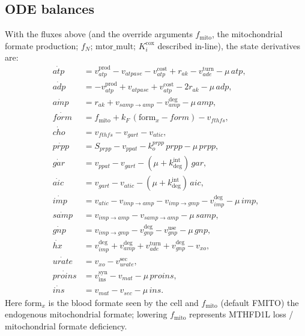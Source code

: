 \documentclass[11pt]{article}
\begin{document}
\subsection{ODE balances}
With the fluxes above (and the override arguments $f_{\mathrm{mito}}$, the
mitochondrial formate production; $f_N$; $\mathrm{mtor\_mult}$; $K_i^{\mathrm{cox}}$
described in-line), the state derivatives are:
\begin{align}
\dot{atp}&=v_{atp}^{\mathrm{prod}}-v_{atpase}-v_{atp}^{\mathrm{cost}}+r_{ak}-v_{ade}^{\mathrm{turn}}-\mu\,atp,\\
\dot{adp}&=-v_{atp}^{\mathrm{prod}}+v_{atpase}+v_{atp}^{\mathrm{cost}}-2r_{ak}-\mu\,adp,\\
\dot{amp}&=r_{ak}+v_{samp\to amp}-v_{amp}^{\mathrm{deg}}-\mu\,amp,\\
\dot{form}&=f_{\mathrm{mito}}+k_F\,(\mathrm{form}_x-form)-v_{fthfs},\\
\dot{cho}&=v_{fthfs}-v_{gart}-v_{atic},\\
\dot{prpp}&=S_{prpp}-v_{ppat}-k_{o}^{prpp}\,prpp-\mu\,prpp,\\
\dot{gar}&=v_{ppat}-v_{gart}-(\mu+k_{\mathrm{deg}}^{\mathrm{int}})\,gar,\\
\dot{aic}&=v_{gart}-v_{atic}-(\mu+k_{\mathrm{deg}}^{\mathrm{int}})\,aic,\\
\dot{imp}&=v_{atic}-v_{imp\to amp}-v_{imp\to gmp}-v_{imp}^{\mathrm{deg}}-\mu\,imp,\\
\dot{samp}&=v_{imp\to amp}-v_{samp\to amp}-\mu\,samp,\\
\dot{gnp}&=v_{imp\to gmp}-v_{gnp}^{\mathrm{deg}}-v_{gnp}^{\mathrm{use}}-\mu\,gnp,\\
\dot{hx}&=v_{imp}^{\mathrm{deg}}+v_{amp}^{\mathrm{deg}}+v_{ade}^{\mathrm{turn}}+v_{gnp}^{\mathrm{deg}}-v_{xo},\\
\dot{urate}&=v_{xo}-v_{urate}^{\mathrm{sec}},\\
\dot{proins}&=v_{\mathrm{ins}}^{\mathrm{syn}}-v_{mat}-\mu\,proins,\\
\dot{ins}&=v_{mat}-v_{sec}-\mu\,ins.
\end{align}
Here $\mathrm{form}_x$ is the blood formate seen by the cell and $f_{\mathrm{mito}}$
(default FMITO) the endogenous mitochondrial formate; lowering $f_{\mathrm{mito}}$
represents MTHFD1L loss / mitochondrial formate deficiency.
\end{document}
